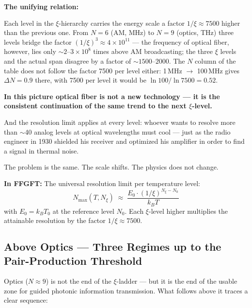 \begin{foundation}
\medskip
\textbf{The unifying relation:}

Each level in the $\xi$-hierarchy carries the energy scale
a factor $1/\xi \approx 7500$ higher than the previous one.
From $N = 6$ (AM, MHz) to $N = 9$ (optics, THz)
three levels bridge the factor
$(1/\xi)^3 \approx 4 \times 10^{11}$ ---
the frequency of optical fiber, however, lies only
$\sim 2$--$3\times10^8$ times above AM broadcasting; the three
$\xi$ levels and the actual span disagree by a factor of
$\sim 1500$--$2000$.
The $N$ column of the table does not follow the factor 7500 per level either:
1\,MHz $\to$ 100\,MHz gives $\Delta N = 0.9$ there, with 7500 per level
it would be $\ln 100/\ln 7500 = 0.52$.

\textbf{In this picture optical fiber is not a new technology ---
it is the consistent continuation of the same trend
to the next $\xi$-level.}

And the resolution limit applies at every level:
whoever wants to resolve more than $\sim$40 analog
levels at optical wavelengths must cool ---
just as the radio engineer in 1930 shielded
his receiver and optimized his amplifier in order
to find a signal in thermal noise.

The problem is the same. The scale shifts.
The physics does not change.

\textbf{In FFGFT:}
The universal resolution limit per temperature level:
\begin{equation}
  \boxed{N_\text{max}(T, N_\xi)
  \;\approx\;
  \frac{E_0 \cdot (1/\xi)^{N_\xi - N_0}}{k_B T}}
\end{equation}
with $E_0 = k_B T_0$ at the reference level $N_0$.
Each $\xi$-level higher multiplies the
attainable resolution by the factor $1/\xi \approx 7500$.
\end{foundation}

\subsection{Above Optics --- Three Regimes up to the Pair-Production Threshold}
\label{sec:above-optics}

Optics ($N \approx 9$) is not the end of the $\xi$-ladder ---
but it is the end of the usable zone for
guided photonic information transmission.
What follows above it traces a clear sequence:

